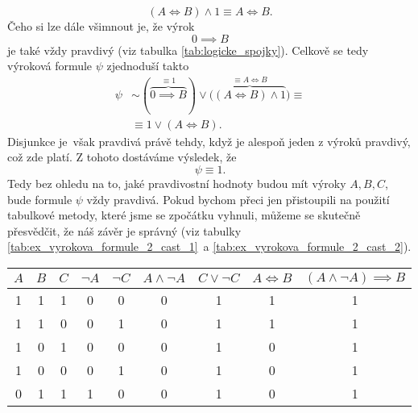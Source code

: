 \begin{example}
\begin{solution}
        \begin{equation*}
            (A \iff B) \land 1 \equiv  A \iff B.
        \end{equation*}
        Čeho si lze dále všimnout je, že výrok
        \begin{equation*}
            0 \implies B
        \end{equation*}
        je také vždy pravdivý (viz tabulka \ref{tab:logicke_spojky}). Celkově se tedy výroková formule $\psi$ zjednoduší takto
        \begin{align*}
            \psi&\sim (\overbrace{0 \implies B}^{\equiv 1}) \lor \bigl(\overbrace{(A \iff B) \land 1}^{\equiv A \iff B}\bigr)\equiv  \\ &\equiv 1 \lor (A \iff B).
        \end{align*}
        Disjunkce je~však pravdivá právě tehdy, když je alespoň jeden z výroků pravdivý, což zde platí. Z tohoto dostáváme výsledek, že
        \begin{equation*}
            \psi\equiv 1.
        \end{equation*}
        Tedy bez ohledu na to, jaké pravdivostní hodnoty budou mít výroky $A,B,C$, bude formule $\psi$ vždy pravdivá. Pokud bychom přeci jen přistoupili na použití tabulkové metody, které jsme se zpočátku vyhnuli, můžeme se skutečně přesvědčit, že náš závěr je správný (viz tabulky \ref{tab:ex_vyrokova_formule_2_cast_1}~a \ref{tab:ex_vyrokova_formule_2_cast_2}).
        \begin{table}[h]
            \centering
            \begin{tabular}{|ccc|cccccc|}
            \hline
            $A$ & $B$ & $C$ & $\neg A$ & $\neg C$ & $A \land \neg A$ & $C \lor \neg C$ & $A \iff B$ & $(A \land \neg A) \implies B$ \\ \hline
            1   & 1   & 1   & 0        & 0        & 0                & 1                 & 1          & 1                             \\
            1   & 1   & 0   & 0        & 1        & 0                & 1                 & 1          & 1                             \\
            1   & 0   & 1   & 0        & 0        & 0                & 1                 & 0          & 1                             \\
            1   & 0   & 0   & 0        & 1        & 0                & 1                 & 0          & 1                             \\
            0   & 1   & 1   & 1        & 0        & 0                & 1                 & 0          & 1                             \\

\end{tabular}
\end{table}
\end{solution}
\end{example}
